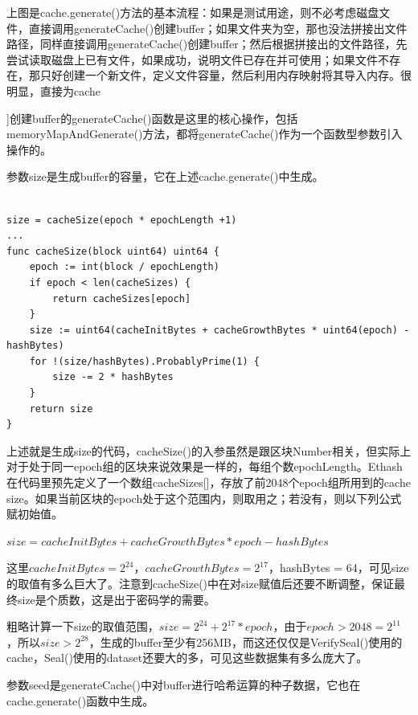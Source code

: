 \documentclass[UTF8]{ctexart}
\begin{document}
上图是cache.generate()方法的基本流程：如果是测试用途，则不必考虑磁盘文件，直接调用generateCache()创建buffer；如果文件夹为空，那也没法拼接出文件路径，同样直接调用generateCache()创建buffer；然后根据拼接出的文件路径，先尝试读取磁盘上已有文件，如果成功，说明文件已存在并可使用；如果文件不存在，那只好创建一个新文件，定义文件容量，然后利用内存映射将其导入内存。很明显，直接为cache{]创建buffer的generateCache()函数是这里的核心操作，包括memoryMapAndGenerate()方法，都将generateCache()作为一个函数型参数引入操作的。


参数size是生成buffer的容量，它在上述cache.generate()中生成。

\begin{lstlisting}

size = cacheSize(epoch * epochLength +1)
...
func cacheSize(block uint64) uint64 {
    epoch := int(block / epochLength)
    if epoch < len(cacheSizes) {
        return cacheSizes[epoch]
    }
    size := uint64(cacheInitBytes + cacheGrowthBytes * uint64(epoch) - hashBytes)
    for !(size/hashBytes).ProbablyPrime(1) {
        size -= 2 * hashBytes
    }
    return size
}

\end{lstlisting}

上述就是生成size的代码，cacheSize()的入参虽然是跟区块Number相关，但实际上对于处于同一epoch组的区块来说效果是一样的，每组个数epochLength。Ethash在代码里预先定义了一个数组cacheSizes[]，存放了前2048个epoch组所用到的cache size。如果当前区块的epoch处于这个范围内，则取用之；若没有，则以下列公式赋初始值。

\begin{center}
$size = cacheInitBytes + cacheGrowthBytes * epoch - hashBytes$
\end{center}

这里$cacheInitBytes = 2^{24}$，$cacheGrowthBytes = 2^{17}$，hashBytes = 64，可见size的取值有多么巨大了。注意到cacheSize()中在对size赋值后还要不断调整，保证最终size是个质数，这是出于密码学的需要。

粗略计算一下size的取值范围，$size = 2^{24} + 2^{17} * epoch$，由于$epoch > 2048 = 2^{11}$，所以$size  > 2^{28}$，生成的buffer至少有256MB，而这还仅仅是VerifySeal()使用的cache{}，Seal()使用的dataset{}还要大的多，可见这些数据集有多么庞大了。


参数seed是generateCache()中对buffer进行哈希运算的种子数据，它也在cache.generate()函数中生成。

\begin{lstlisting}


\end{lstlisting}}
\end{document}
